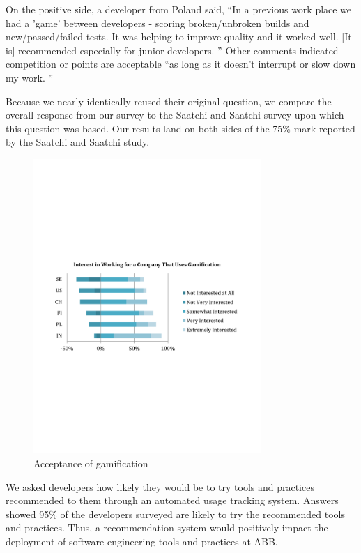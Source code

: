 \documentclass{sig-alternate}
\begin{document}
On the positive side, a developer from Poland said, ``In a previous work place we had a 'game' between developers - scoring broken/unbroken builds and new/passed/failed tests. It was helping to improve quality and it worked well. [It is] recommended especially for junior developers. '' Other comments indicated competition or points are acceptable ``as long as it doesn't interrupt or slow down my work. ''

Because we nearly identically reused their original question, we compare the overall response from our survey to the Saatchi and Saatchi survey\cite{wbsnipes:SaatchiGameification} upon which this question was based.  Our results land on both sides of the 75\% mark reported by the Saatchi and Saatchi study.  

\begin{figure}
	\includegraphics[width=3.4in]{gamificationquestion.pdf}
	\caption{Acceptance of gamification}
	\label{fig:gamification}
\end{figure}

We asked developers how likely they would be to try tools and practices recommended to them through an automated usage tracking system.  Answers showed 95\% of the developers surveyed are likely to try the recommended tools and practices.  Thus, a recommendation system would positively impact the deployment of software engineering tools and practices at ABB.
\end{document}
